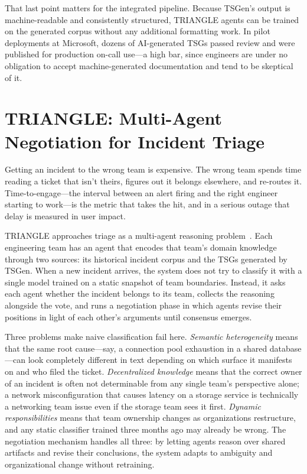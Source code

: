 \documentclass[conference]{IEEEtran}
\begin{document}
That last point matters for the integrated pipeline. Because TSGen's output is
machine-readable and consistently structured, TRIANGLE agents can be trained on
the generated corpus without any additional formatting work. In pilot deployments
at Microsoft, dozens of AI-generated TSGs passed review and were published for
production on-call use---a high bar, since engineers are under no obligation to
accept machine-generated documentation and tend to be skeptical of it.


\section{TRIANGLE: Multi-Agent Negotiation for Incident Triage}

Getting an incident to the wrong team is expensive. The wrong team spends time
reading a ticket that isn't theirs, figures out it belongs elsewhere, and
re-routes it. Time-to-engage---the interval between an alert firing and the
right engineer starting to work---is the metric that takes the hit, and in a
serious outage that delay is measured in user impact.

TRIANGLE approaches triage as a multi-agent reasoning problem~\cite{triangle}.
Each engineering team has an agent that encodes that team's domain knowledge
through two sources: its historical incident corpus and the TSGs generated by
TSGen. When a new incident arrives, the system does not try to classify it
with a single model trained on a static snapshot of team boundaries. Instead,
it asks each agent whether the incident belongs to its team, collects the
reasoning alongside the vote, and runs a negotiation phase in which agents
revise their positions in light of each other's arguments until consensus emerges.

Three problems make naive classification fail here. \textit{Semantic heterogeneity}
means that the same root cause---say, a connection pool exhaustion in a shared
database---can look completely different in text depending on which surface it
manifests on and who filed the ticket. \textit{Decentralized knowledge} means
that the correct owner of an incident is often not determinable from any single
team's perspective alone; a network misconfiguration that causes latency on a
storage service is technically a networking team issue even if the storage team
sees it first. \textit{Dynamic responsibilities} means that team ownership changes
as organizations restructure, and any static classifier trained three months ago
may already be wrong. The negotiation mechanism handles all three: by letting
agents reason over shared artifacts and revise their conclusions, the system
adapts to ambiguity and organizational change without retraining.
\end{document}
